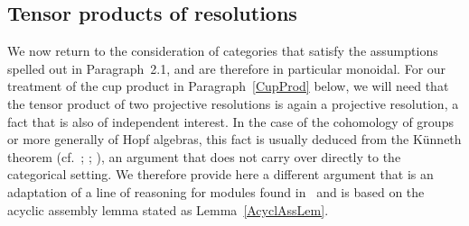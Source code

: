 \documentclass[12pt]{article}
\theoremstyle{definition}
\theoremstyle{break}
\renewcommand{\1}{\mathbbm{1}}
\begin{document}
\subsection{Tensor products of resolutions} \label{TensRes}
We now return to the consideration of categories that satisfy the assumptions spelled out in Paragraph~2.1, and are therefore in particular monoidal. For our treatment of the cup product in Paragraph~\ref{CupProd} below, we will need that the tensor product of two projective resolutions is again a projective resolution, a fact that is also of independent interest. In the case of the cohomology of groups or more generally of Hopf algebras, this fact is usually deduced from the K\"unneth theorem (cf.~\cite[Sec.~3.2, p.~57]{Be}; \cite[Sec.~2.5, p.~17]{E}; \cite[Sec.~9.3, p.~191]{W2}), an argument that does not carry over directly to the categorical setting. We therefore provide here a different argument that is an adaptation of a line of reasoning for modules found in~\cite[Thm.~2.7.2, p.~58]{We} and is based on the acyclic assembly lemma stated as Lemma~\ref{AcyclAssLem}.
\end{document}
